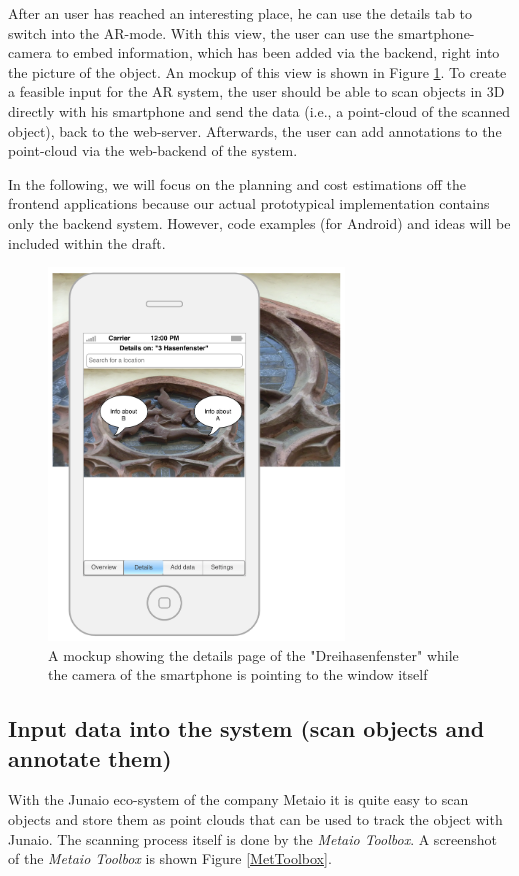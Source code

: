 After an user has reached an interesting place, he can use the details tab to switch into the \ac{AR}-mode. With this view, the user can use the smartphone-camera to embed information, which has been added via the backend, right into the picture of the object. An mockup of this view is shown in Figure \ref{app2}. 
To create a feasible input for the \ac{AR} system, the user should be able to scan objects in 3D directly with his smartphone and send the data (i.e., a point-cloud of the scanned object), back to the web-server.  Afterwards, the user can add annotations to the point-cloud via the web-backend of the system. 

In the following, we will focus on the planning and cost estimations off the frontend applications because our actual prototypical implementation contains only the backend system.  However, code examples (for Android) and ideas will be included within the draft. 

\begin{figure}[th]
\centerline{\includegraphics[width=0.7\textwidth]{gfx/mockup_app_2}}
\caption{A mockup showing the details page of the "Dreihasenfenster" while the camera of the smartphone is pointing to the window itself}
\label{app2}
\end{figure}			
  
\subsection{Input data into the system (scan objects and annotate them)} 
With the Junaio eco-system of the company Metaio it is quite easy to scan objects and store them as point clouds that can be used to track the object with Junaio. The scanning process itself is done by the \emph{Metaio Toolbox}. A screenshot of the \emph{Metaio Toolbox} is shown Figure \ref{MetToolbox}. 

